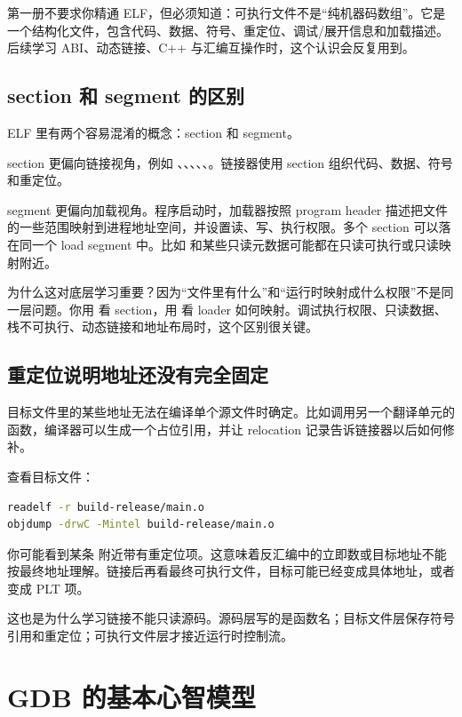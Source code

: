 第一册不要求你精通 ELF，但必须知道：可执行文件不是“纯机器码数组”。它是一个结构化文件，包含代码、数据、符号、重定位、调试/展开信息和加载描述。后续学习 ABI、动态链接、C++ 与汇编互操作时，这个认识会反复用到。

\subsection{section 和 segment 的区别}

ELF 里有两个容易混淆的概念：section 和 segment。

section 更偏向链接视角，例如 、、、、、。链接器使用 section 组织代码、数据、符号和重定位。

segment 更偏向加载视角。程序启动时，加载器按照 program header 描述把文件的一些范围映射到进程地址空间，并设置读、写、执行权限。多个 section 可以落在同一个 load segment 中。比如  和某些只读元数据可能都在只读可执行或只读映射附近。

为什么这对底层学习重要？因为“文件里有什么”和“运行时映射成什么权限”不是同一层问题。你用  看 section，用  看 loader 如何映射。调试执行权限、只读数据、栈不可执行、动态链接和地址布局时，这个区别很关键。

\subsection{重定位说明地址还没有完全固定}

目标文件里的某些地址无法在编译单个源文件时确定。比如调用另一个翻译单元的函数，编译器可以生成一个占位引用，并让 relocation 记录告诉链接器以后如何修补。

查看目标文件：

\begin{lstlisting}[language=bash]
readelf -r build-release/main.o
objdump -drwC -Mintel build-release/main.o
\end{lstlisting}

你可能看到某条  附近带有重定位项。这意味着反汇编中的立即数或目标地址不能按最终地址理解。链接后再看最终可执行文件，目标可能已经变成具体地址，或者变成 PLT 项。

这也是为什么学习链接不能只读源码。源码层写的是函数名；目标文件层保存符号引用和重定位；可执行文件层才接近运行时控制流。

\section{GDB 的基本心智模型}

